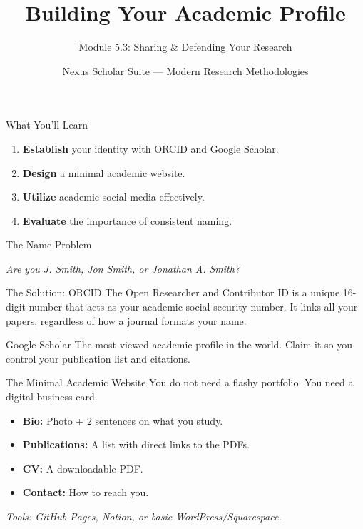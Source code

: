 \documentclass[aspectratio=169]{beamer}
\title{Building Your Academic Profile}
\subtitle{Module 5.3: Sharing \& Defending Your Research}
\author{Nexus Scholar Suite --- Modern Research Methodologies}
\date{}
\begin{document}
\begin{frame}[plain]
  \titlepage
\end{frame}

\begin{frame}{What You'll Learn}
  \begin{enumerate}
    \item \textbf{Establish} your identity with ORCID and Google Scholar.
    \item \textbf{Design} a minimal academic website.
    \item \textbf{Utilize} academic social media effectively.
    \item \textbf{Evaluate} the importance of consistent naming.
  \end{enumerate}
\end{frame}

\begin{frame}{The Name Problem}
  \begin{center}
    \textit{Are you J. Smith, Jon Smith, or Jonathan A. Smith?}
  \end{center}
  \vspace{0.3cm}
  \begin{alertblock}{The Solution: ORCID}
    The Open Researcher and Contributor ID is a unique 16-digit number that acts as your academic social security number. It links all your papers, regardless of how a journal formats your name.
  \end{alertblock}
  \begin{exampleblock}{Google Scholar}
    The most viewed academic profile in the world. Claim it so you control your publication list and citations.
  \end{exampleblock}
\end{frame}

\begin{frame}{The Minimal Academic Website}
  You do not need a flashy portfolio. You need a digital business card.
  \vspace{0.3cm}
  \begin{itemize}
    \item \textbf{Bio:} Photo + 2 sentences on what you study.
    \item \textbf{Publications:} A list with direct links to the PDFs.
    \item \textbf{CV:} A downloadable PDF.
    \item \textbf{Contact:} How to reach you.
  \end{itemize}
  \vspace{0.3cm}
  \textit{Tools: GitHub Pages, Notion, or basic WordPress/Squarespace.}
\end{frame}
\end{document}
